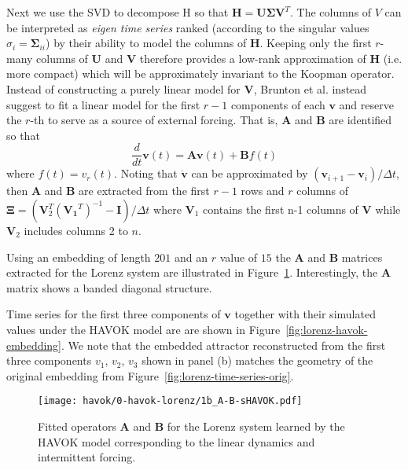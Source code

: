 Next we use the SVD to decompose H so that $\mathbf{H} =
\mathbf{U}\mathbf{\Sigma} \mathbf{V}^T$. The columns of $V$ can be interpreted
as \textit{eigen time series} ranked (according to the singular values $\sigma_i
= \mathbf{\Sigma}_{ii}$) by their ability to model the columns of $\mathbf{H}$.
Keeping only the first $r$-many columns of $\mathbf{U}$ and $\mathbf{V}$
therefore provides a low-rank approximation of $\mathbf{H}$ (i.e. more compact)
which will be approximately invariant to the Koopman operator. Instead of
constructing a purely linear model for $\mathbf{V}$, Brunton et al. instead
suggest to fit a linear model for the first $r-1$ components of each
$\mathbf{v}$ and reserve the $r$-th to serve as a source of external forcing.
That is, $\mathbf{A}$ and $\mathbf{B}$ are identified so that
\begin{equation}
  \frac{d}{dt} \mathbf{v}(t) = \mathbf{A}\mathbf{v}(t) + \mathbf{B}f(t)
\end{equation}
where $f(t) = v_r(t)$. Noting that $\dot{\mathbf{v}}$ can be approximated by
$(\mathbf{v}_{i+1}-\mathbf{v}_i)/\Delta t$, then $\mathbf{A}$ and $\mathbf{B}$
are extracted from the first $r-1$ rows and $r$ columns of $\mathbf{\Xi} =
\left(\mathbf{V}_2^T(\mathbf{V_1}^T)^{-1} - \mathbf{I} \right)/ \Delta t$ where
$\mathbf{V}_1$ contains the first n-1 columns of $\mathbf{V}$ while
$\mathbf{V}_2$ includes columns 2 to $n$.

Using an embedding of length $201$ and an $r$ value of $15$ the $\mathbf{A}$ and
$\mathbf{B}$ matrices extracted for the Lorenz system are illustrated in
Figure~\ref{fig:lorenz-A-B-heatmap}. Interestingly, the $\mathbf{A}$
matrix shows a banded diagonal structure.


Time series for the first three components of $\mathbf{v}$ together with their
simulated values under the HAVOK model are are shown in
Figure~\ref{fig:lorenz-havok-embedding}. We note that the embedded attractor
reconstructed from the first three components $v_1$, $v_2$, $v_3$ shown in panel
(b) matches the geometry of the original embedding from Figure~\ref{fig:lorenz-time-series-orig}.

\clearpage
\newpage

\begin{figure}[h]
  \centering
  \texttt{[image: havok/0-havok-lorenz/1b\_A-B-sHAVOK.pdf]}
  \caption{Fitted operators $\mathbf{A}$ and $\mathbf{B}$ for the Lorenz system
    learned by the HAVOK model corresponding to the linear dynamics and
    intermittent forcing.}
  \label{fig:lorenz-A-B-heatmap}
\end{figure}


